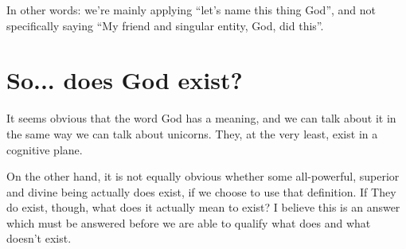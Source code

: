 \documentclass{article}
\begin{document}
	In other words: we're mainly applying ``let's name this thing God'', and not specifically saying ``My friend and singular entity, God, did this''. 

	\section*{So... does God exist?}

	It seems obvious that the word God has a meaning, and we can talk about it in the same way we can talk about unicorns. They, at the very least, exist in a cognitive plane.

	On the other hand, it is not equally obvious whether some all-powerful, superior and divine being actually does exist, if we choose to use that definition. If They do exist, though, what does it actually mean to exist? I believe this is an answer which must be answered before we are able to qualify what does and what doesn't exist.

	\printbibliography{}
\end{document}
